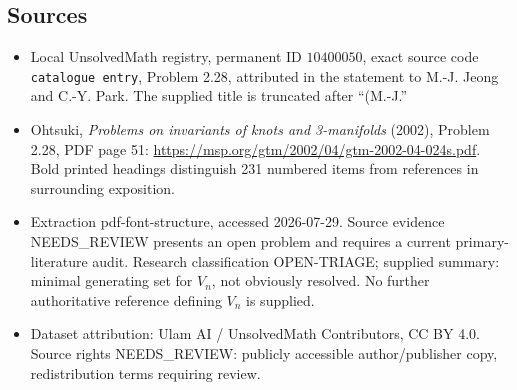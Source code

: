 \documentclass[11pt]{article}
\begin{document}
\subsection{Sources}
\begin{itemize}
\item Local UnsolvedMath registry, permanent ID \(10400050\), exact source code \texttt{catalogue entry}, Problem 2.28, attributed in the statement to M.-J. Jeong and C.-Y. Park. The supplied title is truncated after ``(M.-J.''
\item Ohtsuki, \emph{Problems on invariants of knots and 3-manifolds} (2002), Problem 2.28, PDF page 51: \url{https://msp.org/gtm/2002/04/gtm-2002-04-024s.pdf}. Bold printed headings distinguish 231 numbered items from references in surrounding exposition.
\item Extraction pdf-font-structure, accessed 2026-07-29. Source evidence NEEDS\_REVIEW presents an open problem and requires a current primary-literature audit. Research classification OPEN-TRIAGE; supplied summary: minimal generating set for \(V_n\), not obviously resolved. No further authoritative reference defining \(V_n\) is supplied.
\item Dataset attribution: Ulam AI / UnsolvedMath Contributors, CC BY 4.0. Source rights NEEDS\_REVIEW: publicly accessible author/publisher copy, redistribution terms requiring review.
\end{itemize}
\end{document}
